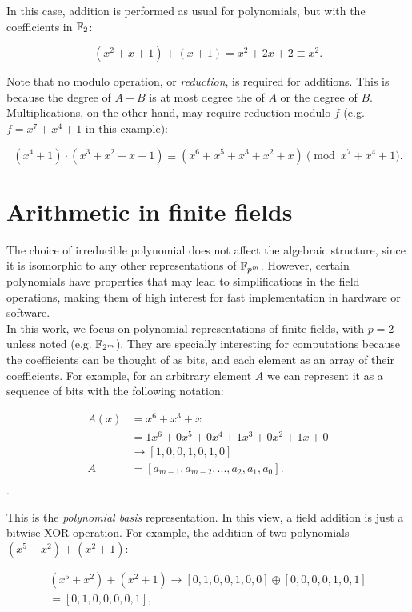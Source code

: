 In this case, addition is performed as usual for polynomials, but with the coefficients in $\mathbb{F}_2$:

$$(x^2+x+1) + (x+1) = x^2+2x+2 \equiv x^2.$$

Note that no modulo operation, or \emph{reduction}, is required for additions. This is because the degree of $A+B$ is at most degree the of $A$ or the degree of $B$. Multiplications, on the other hand, may require reduction modulo $f$ (e.g. $f=x^7+x^4+1$ in this example):

$$(x^4+1) \cdot (x^3+x^2+x+1) \equiv (x^6+x^5+x^3+x^2+x) \pmod{x^7+x^4+1}.$$

\section{Arithmetic in finite fields} \label{background:arithmetic}

The choice of irreducible polynomial does not affect the algebraic structure, since it is isomorphic to any other representations of $\mathbb{F}_{p^m}$. However, certain polynomials have properties that may lead to simplifications in the field operations, making them of high interest for fast implementation in hardware or software.\\

In this work, we focus on polynomial representations of finite fields, with $p=2$ unless noted (e.g. $\mathbb{F}_{2^m}$). They are specially interesting for computations because the coefficients can be thought of as bits, and each element as an array of their coefficients. For example, for an arbitrary element $A$ we can represent it as a sequence of bits with the following notation:

\begin{align*}
A(x) &= x^6+x^3+x \\
& = 1x^6+0x^5+0x^4+1x^3+0x^2+1x+0\\
& \rightarrow [1, 0, 0, 1, 0, 1, 0] \\
A &= [a_{m-1}, a_{m-2}, ..., a_2, a_1, a_0].\\
\end{align*}.

This is the \emph{polynomial basis} representation. In this view, a field addition is just a bitwise XOR operation. For example, the addition of two polynomials $(x^5+x^2)+(x^2+1)$:

\begin{gather*}
(x^5+x^2)+(x^2+1) \rightarrow [0, 1, 0, 0, 1, 0, 0] \oplus [0, 0, 0, 0, 1, 0, 1] \\
= [0, 1, 0, 0, 0, 0, 1],
\end{gather*}

